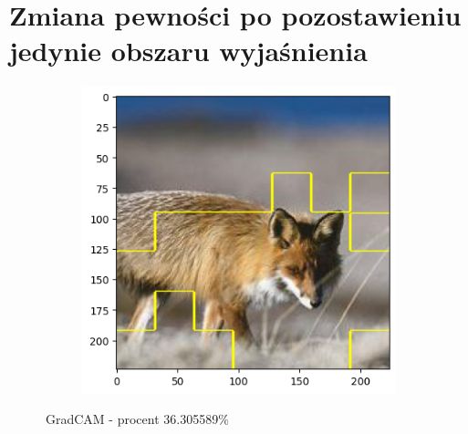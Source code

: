 \section*{Zmiana pewności po pozostawieniu jedynie obszaru wyjaśnienia}
\begin{figure}[h]
	\centering
	\begin{subfigure}[b]{0.3\textwidth}
		\includegraphics[width=.9\textwidth]{img/examples/appendix/n02119022_08938_gradcam}
	\end{subfigure}
	\caption{GradCAM - procent 36.305589\%}
	\label{}
\end{figure}

